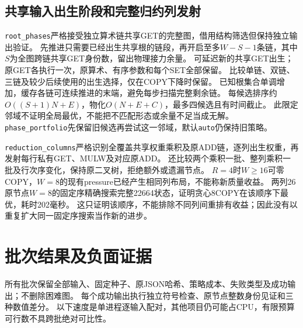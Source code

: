 \documentclass[UTF8,11pt,a4paper]{ctexart}
\begin{document}
\subsection{共享输入出生阶段和完整归约列发射}
\texttt{root\_phases}严格接受独立算术链共享GET的完整图，借用结构筛选但保持独立输出验证。
先推进只需要已经出生共享根的链段，再开启至多$W-S-1$条链，其中$S$为全图跨链共享GET身份数，留出物理接力余量。
可延迟新的共享GET出生；原GET各执行一次，原算术、有序参数和每个SET全部保留。
比较单链、双链、三链及较少后续使用的出生选择，仅在COPY下降时保留。
已知根集合单调增加，缓存各链可连续推进的末端，避免每步扫描完整剩余链。
每候选排序约$O((S+1)N+E)$，物化$O(N+E+C)$，最多四候选且有时间截止。
此限定邻域不证明全局最优，不能把不匹配形态或余量不足当成无解。
\texttt{phase\_portfolio}先保留旧候选再尝试这一邻域，默认\texttt{auto}仍保持旧策略。

\texttt{reduction\_columns}严格识别全覆盖共享权重乘积及原ADD链，逐列出生权重，再发射每行私有GET、MULW及对应原ADD。
还比较两个乘积一批、整列乘积一批及行次序变化，保持原二叉树，拒绝额外或遗漏节点。
$R=4$时$W\ge16$可零COPY，$W=8$的现有pressure已经产生相同列布局，不能称新质量收益。
两列26原节点$W=8$的固定序精确搜索完整22664状态，证明贪心8COPY在该顺序下最优，耗时202毫秒。
这只证明该顺序，不能排除不同列间重排有收益；因此没有以重复扩大同一固定序搜索当作新的进步。

\section{批次结果及负面证据}
所有批次保留全部输入、固定种子、原JSON哈希、策略成本、失败类型及成功输出；不删除困难图。
每个成功输出执行独立符号检查、原节点整数身份见证和三种数值差分。
以下速度是单进程逐输入配对，其他项目仍可能占CPU，有限预算可行数不具跨批绝对可比性。
\end{document}
